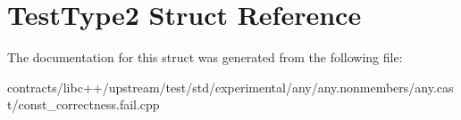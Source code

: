 \hypertarget{struct_test_type2}{}\section{Test\+Type2 Struct Reference}
\label{struct_test_type2}


The documentation for this struct was generated from the following file\+:\begin{DoxyCompactItemize}
\item 
contracts/libc++/upstream/test/std/experimental/any/any.\+nonmembers/any.\+cast/const\+\_\+correctness.\+fail.\+cpp\end{DoxyCompactItemize}
